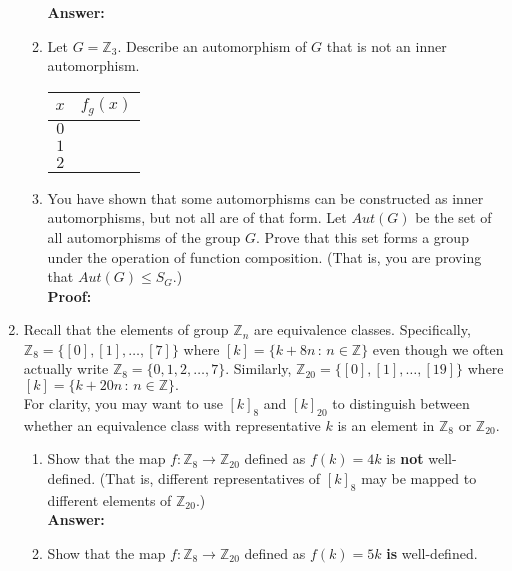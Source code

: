 \documentclass[12pt]{article}
\renewcommand{\emph}[1]{\textsf{\textbf{#1}}}
\newcommand{\bbZ}{\mathbb{Z}}
\begin{document}
\begin{enumerate}
\begin{enumerate}
	\textbf{Answer:}
	\vfill
	
	\item Let $G=\bbZ_3.$ Describe an automorphism of $G$ that is not an inner automorphism.\\
	
	\begin{tabular}{c|c}
	$x$ & $f_g(x)$ \\
	\hline
	$0$ & \\
	$1$ & \\
	$2$ & \\
	\end{tabular}
	
	\item You have shown that some automorphisms can be constructed as inner automorphisms, but not all are of that form. Let $Aut(G)$ be the set of all automorphisms of the group $G.$ Prove that this set forms a group under the operation of function composition. (That is, you are proving that $Aut(G) \leq S_G.$)\\
	
	\textbf{Proof:}
	\vfill
	
	\end{enumerate}
\newpage

\item Recall that the elements of group $\bbZ_n$ are equivalence classes. Specifically, $\bbZ_8=\{ [0], [1], \dots, [7]\}$ where $[k]=\{k+8n \, : \, n \in \bbZ\}$ even though we often actually write $\bbZ_8=\{0,1,2,\dots, 7\}.$ Similarly, $\bbZ_{20}=\{ [0], [1], \dots, [19]\}$ where $[k]=\{k+20n \, : \, n \in \bbZ\}.$\\

For clarity, you may want to use $[k]_8$ and $[k]_{20}$ to distinguish between whether an equivalence class with representative $k$ is an element in $\bbZ_8$ or $\bbZ_{20}.$
\begin{enumerate}
	\item Show that the map $f:\bbZ_8 \to \bbZ_{20}$ defined as $f(k)=4k$ is \emph{not} well-defined. (That is, different representatives of $[k]_8$ may be mapped to different elements of $\bbZ_{20}.$)\\
	
	\textbf{Answer:} \\
	
	\item Show that the map $f:\bbZ_8 \to \bbZ_{20}$ defined as $f(k)=5k$ \emph{is} well-defined. \\
	

\end{enumerate}
\end{enumerate}
\end{document}
